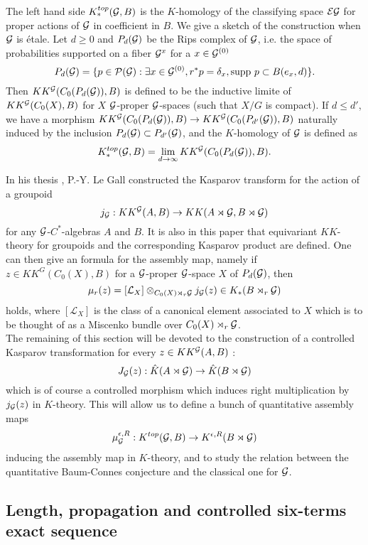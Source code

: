 The left hand side $K^{top}_*(\mathcal G,B)$ is the $K$-homology of the classifying space $\mathcal E \mathcal G$ for proper actions of $\mathcal G$ in coefficient in $B$. We give a sketch of the construction when $\mathcal G$ is étale. Let $d\geq 0$ and $P_d(\mathcal G)$ be the Rips complex of $\mathcal G$, i.e. the space of probabilities supported on a fiber $\mathcal G^x$ for a $x\in \mathcal G^{(0)}$
\[P_d(\mathcal G) = \{p\in \mathcal P(\mathcal G) : \exists x\in \mathcal G^{(0)}, r^*p=\delta_x, \text{supp }p \subset B(e_x,d)\}.\]
Then $KK^\mathcal G( C_0(P_d(\mathcal G)),B)$ is defined to be the inductive limite of $KK^\mathcal G( C_0(X),B)$ for $X$ $\mathcal G$-proper $\mathcal G$-spaces (such that $X/G$ is compact). If $d\leq d'$, we have a morphism $KK^\mathcal G( C_0(P_d(\mathcal G)),B)\rightarrow KK^\mathcal G( C_0(P_{d'}(\mathcal G)),B)$ naturally induced by the inclusion $P_d(\mathcal G)\subset P_{d'}(\mathcal G)$, and the $K$-homology of $\mathcal G$ is defined as
\[K^{top}_*(\mathcal G,B)=\lim_{d\rightarrow \infty} KK^\mathcal G( C_0(P_d(\mathcal G)),B).\]

In his thesis \cite{LeGall}, P.-Y. Le Gall constructed the Kasparov transform for the action of a groupoid
\[j_\mathcal G : KK^\mathcal G(A,B)\rightarrow KK(A\rtimes \mathcal G,B\rtimes \mathcal G)\]
for any $\mathcal G$-$C^*$-algebras $A$ and $B$. It is also in this paper that equivariant $KK$-theory for groupoids and the corresponding Kasparov product are defined. One can then give an formula for the assembly map, namely if $z\in KK^G(C_0(X),B)$ for a $\mathcal G$-proper $\mathcal G$-space $X$ of $P_d(\mathcal G)$, then
\[\mu_r(z)=[\mathcal L_X]\otimes_{C_0(X)\rtimes_r \mathcal G} j_\mathcal G(z) \in K_*(B\rtimes_r \mathcal G) \]
holds, where $[\mathcal L_X]$ is the class of a canonical element associated to $X$ which is to be thought of as a Miscenko bundle over $C_0(X)\rtimes_r \mathcal G$.\\

The remaining of this section will be devoted to the construction of a controlled Kasparov transformation for every $z\in KK^\mathcal G(A,B)$ :
\[J_\mathcal G(z) : \hat K(A\rtimes \mathcal G)\rightarrow \hat K(B\rtimes \mathcal G)\] 
which is of course a controlled morphism which induces right multiplication by $j_\mathcal G(z)$ in $K$-theory. This will allow us to define a bunch of quantitative assembly maps
\[\mu_\mathcal G^{\epsilon, R}: K^{top}(\mathcal G,B)\rightarrow K^{\epsilon,R}(B\rtimes \mathcal G)\]
inducing the assembly map in $K$-theory, and to study the relation between the quantitative Baum-Connes conjecture and the classical one for $\mathcal G$.

\subsection{Length, propagation and controlled six-terms exact sequence}

